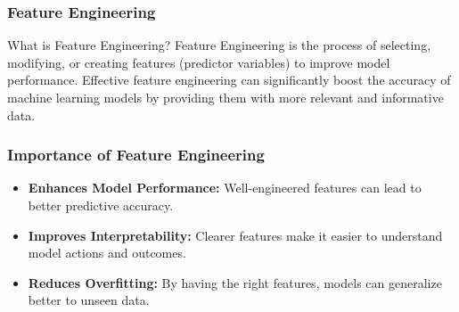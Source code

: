 \documentclass{beamer}
\begin{document}
\begin{frame}[fragile]
    \frametitle{Feature Engineering}
    \begin{block}{What is Feature Engineering?}
        Feature Engineering is the process of selecting, modifying, or creating features (predictor variables) to improve model performance. Effective feature engineering can significantly boost the accuracy of machine learning models by providing them with more relevant and informative data.
    \end{block}
\end{frame}

\begin{frame}[fragile]
    \frametitle{Importance of Feature Engineering}
    \begin{itemize}
        \item \textbf{Enhances Model Performance:} Well-engineered features can lead to better predictive accuracy.
        \item \textbf{Improves Interpretability:} Clearer features make it easier to understand model actions and outcomes.
        \item \textbf{Reduces Overfitting:} By having the right features, models can generalize better to unseen data.
    \end{itemize}
\end{frame}
\end{document}
